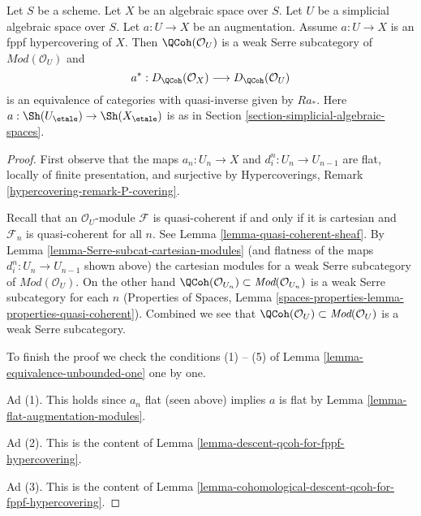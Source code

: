 \begin{lemma}
\label{lemma-coh-descent-qcoh-unbounded-for-fppf-hypercovering}
Let $S$ be a scheme. Let $X$ be an algebraic space over $S$.
Let $U$ be a simplicial algebraic space over $S$. Let $a : U \to X$
be an augmentation. Assume $a : U \to X$ is an fppf hypercovering of $X$.
Then $\QCoh(\mathcal{O}_U)$ is a weak Serre subcategory of
$\textit{Mod}(\mathcal{O}_U)$ and
$$
a^* : D_\QCoh(\mathcal{O}_X) \longrightarrow D_\QCoh(\mathcal{O}_U)
$$
is an equivalence of categories with quasi-inverse given by
$Ra_*$. Here $a : \Sh(U_\etale) \to \Sh(X_\etale)$
is as in Section \ref{section-simplicial-algebraic-spaces}.
\end{lemma}

\begin{proof}
First observe that the maps $a_n : U_n \to X$ and $d^n_i : U_n \to U_{n - 1}$
are flat, locally of finite presentation, and surjective by
Hypercoverings, Remark \ref{hypercovering-remark-P-covering}.

\medskip\noindent
Recall that an $\mathcal{O}_U$-module $\mathcal{F}$ is quasi-coherent if and
only if it is cartesian and $\mathcal{F}_n$ is quasi-coherent for all $n$.
See Lemma \ref{lemma-quasi-coherent-sheaf}.
By Lemma \ref{lemma-Serre-subcat-cartesian-modules}
(and flatness of the maps $d^n_i : U_n \to U_{n - 1}$ shown above)
the cartesian modules for a weak Serre subcategory of
$\textit{Mod}(\mathcal{O}_U)$. On the other hand
$\QCoh(\mathcal{O}_{U_n}) \subset \textit{Mod}(\mathcal{O}_{U_n})$
is a weak Serre subcategory for each $n$
(Properties of Spaces, Lemma
\ref{spaces-properties-lemma-properties-quasi-coherent}).
Combined we see that
$\QCoh(\mathcal{O}_U) \subset \textit{Mod}(\mathcal{O}_U)$
is a weak Serre subcategory.

\medskip\noindent
To finish the proof we check the conditions (1) -- (5) of
Lemma \ref{lemma-equivalence-unbounded-one} one by one.

\medskip\noindent
Ad (1). This holds since $a_n$ flat (seen above) implies $a$ is flat
by Lemma \ref{lemma-flat-augmentation-modules}.

\medskip\noindent
Ad (2). This is the content of
Lemma \ref{lemma-descent-qcoh-for-fppf-hypercovering}.

\medskip\noindent
Ad (3). This is the content of
Lemma \ref{lemma-cohomological-descent-qcoh-for-fppf-hypercovering}.


\end{proof}
